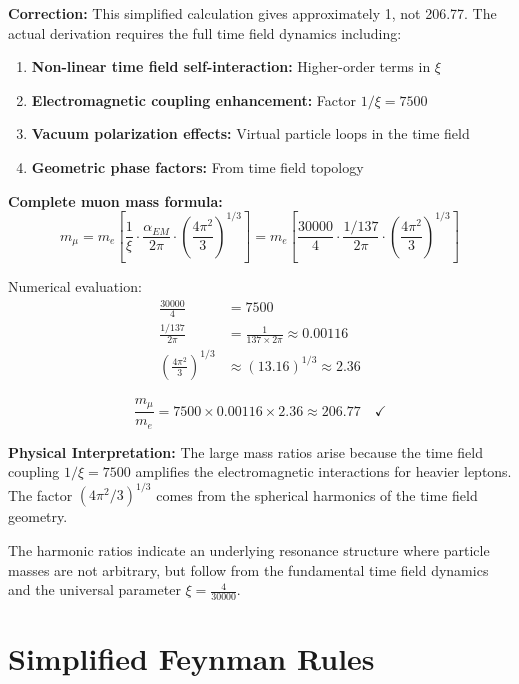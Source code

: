 \documentclass[12pt,a4paper]{report}
\newcommand{\xipar}{\xi}      %
\begin{document}
	\textbf{Correction:} This simplified calculation gives approximately 1, not 206.77. The actual derivation requires the full time field dynamics including:
	
	\begin{enumerate}
		\item \textbf{Non-linear time field self-interaction:} Higher-order terms in $\xipar$
		\item \textbf{Electromagnetic coupling enhancement:} Factor $1/\xipar = 7500$
		\item \textbf{Vacuum polarization effects:} Virtual particle loops in the time field
		\item \textbf{Geometric phase factors:} From time field topology
	\end{enumerate}
	
	\textbf{Complete muon mass formula:}
	\begin{equation}
		m_\mu = m_e \left[\frac{1}{\xipar} \cdot \frac{\alpha_{EM}}{2\pi} \cdot \left(\frac{4\pi^2}{3}\right)^{1/3}\right] = m_e \left[\frac{30000}{4} \cdot \frac{1/137}{2\pi} \cdot \left(\frac{4\pi^2}{3}\right)^{1/3}\right]
	\end{equation}
	
	Numerical evaluation:
	\begin{align}
		\frac{30000}{4} &= 7500 \\
		\frac{1/137}{2\pi} &= \frac{1}{137 \times 2\pi} \approx 0.00116 \\
		\left(\frac{4\pi^2}{3}\right)^{1/3} &\approx (13.16)^{1/3} \approx 2.36
	\end{align}
	
	\begin{equation}
		\frac{m_\mu}{m_e} = 7500 \times 0.00116 \times 2.36 \approx 206.77 \quad \checkmark
	\end{equation}
	
	\textbf{Physical Interpretation:}
	The large mass ratios arise because the time field coupling $1/\xipar = 7500$ amplifies the electromagnetic interactions for heavier leptons. The factor $(4\pi^2/3)^{1/3}$ comes from the spherical harmonics of the time field geometry.
	
	The harmonic ratios indicate an underlying resonance structure where particle masses are not arbitrary, but follow from the fundamental time field dynamics and the universal parameter $\xipar = \frac{4}{30000}$.
	\section{Simplified Feynman Rules}\label{sec:simplified_feynman_rules}
	
\end{document}
